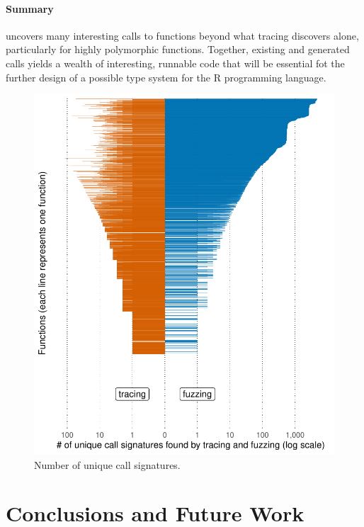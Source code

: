 \documentclass[sigplan,nonacm,anonymous,review]{acmart}
\begin{document}
\paragraph{Summary}

\tool uncovers many interesting calls to functions beyond what tracing discovers alone, particularly for highly polymorphic functions.
Together, existing and generated calls yields a wealth of interesting, runnable code that will be essential fot the further design of a possible type system for the R programming language.


\begin{figure}
    \centering
    \includegraphics[width=\columnwidth]{code-and-figures/uf-call-signatures.pdf}
    \caption{Number of unique call signatures.}
    \label{fig:call-signatures}
\end{figure}

\section{Conclusions and Future Work}
\label{sec:conclusions}
\end{document}
